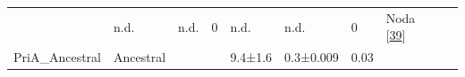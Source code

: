 \documentclass[12pt,twoside]{reedthesis}
\begin{document}
\begin{longtable}[]{@{}lllllllllll@{}}
\begin{minipage}[t]{0.04\columnwidth}
  \strut
  \end{minipage} & \begin{minipage}[t]{0.06\columnwidth}\raggedright\strut
  n.d.\strut
  \end{minipage} & \begin{minipage}[t]{0.06\columnwidth}\raggedright\strut
  n.d.\strut
  \end{minipage} & \begin{minipage}[t]{0.06\columnwidth}\raggedright\strut
  0\strut
  \end{minipage} & \begin{minipage}[t]{0.05\columnwidth}\raggedright\strut
  n.d.\strut
  \end{minipage} & \begin{minipage}[t]{0.05\columnwidth}\raggedright\strut
  n.d.\strut
  \end{minipage} & \begin{minipage}[t]{0.03\columnwidth}\raggedright\strut
  0\strut
  \end{minipage} & \begin{minipage}[t]{0.11\columnwidth}\raggedright\strut
  Noda {[}\protect\hyperlink{ref-noda-garcia_insights_2015}{39}{]}\strut
  \end{minipage}\tabularnewline
  \begin{minipage}[t]{0.15\columnwidth}\raggedright\strut
  PriA\_Ancestral\strut
  \end{minipage} & \begin{minipage}[t]{0.05\columnwidth}\raggedright\strut
  Ancestral\strut
  \end{minipage} & \begin{minipage}[t]{0.04\columnwidth}\raggedright\strut
  \strut
  \end{minipage} & \begin{minipage}[t]{0.04\columnwidth}\raggedright\strut
  \strut
  \end{minipage} & \begin{minipage}[t]{0.06\columnwidth}\raggedright\strut
  9.4±1.6\strut
  \end{minipage} & \begin{minipage}[t]{0.06\columnwidth}\raggedright\strut
  0.3±0.009\strut
  \end{minipage} & \begin{minipage}[t]{0.06\columnwidth}\raggedright\strut
  0.03\strut
  \end{minipage} & \begin{minipage}[t]{0.05\columnwidth}\raggedright\strut

\end{minipage}
\end{longtable}
\end{document}

